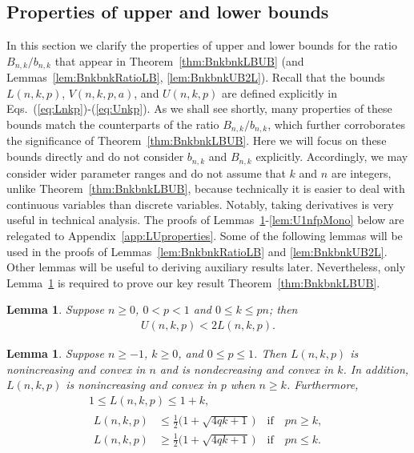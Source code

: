 \documentclass[aop]{imsart}
\theoremstyle{plain}
\newtheorem{lemma}[theorem]{Lemma}
\theoremstyle{remark}
\newcommand{\1}{\operatorname{\uppercase\expandafter{\romannumeral1}}}
\newcommand{\2}{\operatorname{\uppercase\expandafter{\romannumeral2}}}
\newcommand{\3}{\operatorname{\uppercase\expandafter{\romannumeral3}}}
\newcommand{\4}{\operatorname{\uppercase\expandafter{\romannumeral4}}}
\newcommand{\5}{\operatorname{\uppercase\expandafter{\romannumeral5}}}
\newcommand{\6}{\operatorname{\uppercase\expandafter{\romannumeral6}}}
\newcommand{\7}{\operatorname{\uppercase\expandafter{\romannumeral7}}}
\newcommand{\8}{\operatorname{\uppercase\expandafter{\romannumeral8}}}
\newcommand{\9}{\operatorname{\uppercase\expandafter{\romannumeral9}}}
\def\eqref#1{\textup{(\ref{#1})}}
\newcommand{\thref}[1]{Theorem~\ref{#1}}
\newcommand{\lref}[1]{Lemma~\ref{#1}}
\newcommand{\lsref}[1]{Lemmas~\ref{#1}}
\newcommand{\aref}[1]{Appendix~\ref{#1}}
\begin{document}
\subsection{Properties of upper and lower bounds}\label{S4-2}
In this section 
we clarify the properties of upper  and lower bounds for the ratio $B_{n,k}/b_{n,k}$ that appear in \thref{thm:BnkbnkLBUB} (and  \lsref{lem:BnkbnkRatioLB}, \ref{lem:BnkbnkUB2L}). Recall that the bounds $L(n,k,p)$, $V(n,k,p,a)$, and $U(n,k,p)$ are defined explicitly in  Eqs.~\eqref{eq:Lnkp}-\eqref{eq:Unkp}. 
As we shall see shortly, many properties of these bounds match the counterparts of the ratio $B_{n,k}/b_{n,k}$, which further corroborates the significance of  \thref{thm:BnkbnkLBUB}. 
Here we will focus on these bounds directly and do not consider $b_{n,k}$ and $B_{n,k}$ explicitly. 
Accordingly, we may consider wider parameter ranges and do not assume that $k$ and $n$ are integers, unlike \thref{thm:BnkbnkLBUB}, because technically  it is easier to deal with continuous variables than discrete variables. Notably, taking derivatives is very useful in technical analysis. 
The proofs of \lsref{lem:U1nkp2L}-\ref{lem:U1nfpMono} below are relegated to \aref{app:LUproperties}.
Some of the following lemmas will be used in the proofs of \lsref{lem:BnkbnkRatioLB} and \ref{lem:BnkbnkUB2L}. Other lemmas will be useful to deriving auxiliary results later. Nevertheless, only \lref{lem:U1nkp2L} is required to prove our key result \thref{thm:BnkbnkLBUB}. 



\begin{lemma}\label{lem:U1nkp2L}
	Suppose $n\geq 0$, $0<p<1$ and $0\leq k\leq p n$; then
	\begin{align}\label{eq:U1nkp2L}
	U(n,k,p)< 2L(n,k,p).
	\end{align} 
\end{lemma}

\begin{lemma}\label{lem:Lnkpmono}
	Suppose  $n\geq  -1$,  $k\geq  0$, and $0\leq p\leq 1$.  Then $L(n,k,p)$ is nonincreasing and convex in $n$ and is nondecreasing and convex in $k$. In addition,  $L(n,k,p)$ is nonincreasing and convex in $p$ when $n\geq k$.  Furthermore, 
	\begin{gather}
	1\leq L(n,k,p)\leq 1+k, \label{eq:LnkpLBUB}\\ 
	\begin{split}
	L(n,k,p)&\leq \frac{1}{2}\bigl(1+\sqrt{4q k+1}\,\bigr) \quad \mbox{if} \quad p n\geq k,\\
	L(n,k,p)&\geq \frac{1}{2}\bigl(1+\sqrt{4q k+1}\,\bigr)\quad \mbox{if} \quad p n\leq  k.  
	\end{split}
	\label{eq:LnkpLBUB2}
	\end{gather} 	
\end{lemma}
\end{document}
